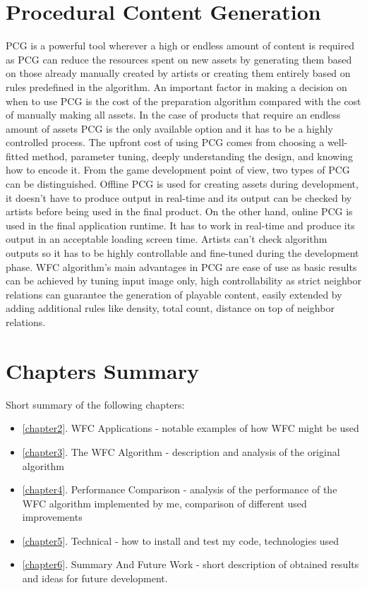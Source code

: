 \documentclass[shortabstract, english, inz]{iithesis}
\begin{document}
\section{Procedural Content Generation}
PCG is a powerful tool wherever a high or endless amount of content is required as PCG can reduce the resources spent on new assets by generating them based on those already manually created by artists or creating them entirely based on rules predefined in the algorithm. An important factor in making a decision on when to use PCG is the cost of the preparation algorithm compared with the cost of manually making all assets. In the case of products that require an endless amount of assets PCG is the only available option and it has to be a highly controlled process. The upfront cost of using PCG comes from choosing a well-fitted method, parameter tuning, deeply understanding the design, and knowing how to encode it.
From the game development point of view, two types of PCG can be distinguished. Offline PCG is used for creating assets during development, it doesn't have to produce output in real-time and its output can be checked by artists before being used in the final product. On the other hand, online PCG is used in the final application runtime. It has to work in real-time and produce its output in an acceptable loading screen time. Artists can't check algorithm outputs so it has to be highly controllable and fine-tuned during the development phase.\cite{DesignLevelConstraints}\break\break
WFC algorithm's main advantages in PCG are ease of use as basic results can be achieved by tuning input image only, high controllability as strict neighbor relations can guarantee the generation of playable content, easily extended by adding additional rules like density, total count, distance on top of neighbor relations. \cite{Smith, DesignLevelConstraints}

\section{Chapters Summary}
Short summary of the following chapters:
\begin{itemize}
    \item \ref{chapter2}. WFC Applications - notable examples of how WFC might be used
    \item \ref{chapter3}. The WFC Algorithm - description and analysis of the original algorithm
    \item \ref{chapter4}. Performance Comparison - analysis of the performance of the WFC algorithm implemented by me, comparison of different used improvements
    \item \ref{chapter5}. Technical - how to install and test my code, technologies used
    \item \ref{chapter6}. Summary And Future Work - short description of obtained results and ideas for future development.
\end{itemize}
\end{document}
